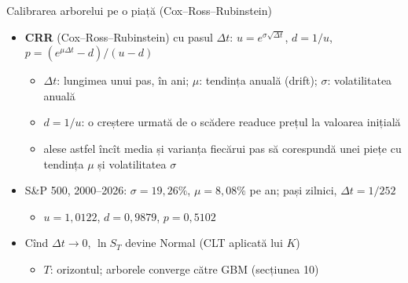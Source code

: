 \begin{frame}{Calibrarea arborelui pe o piață (Cox--Ross--Rubinstein)}
\itemsize{\footnotesize}
\begin{itemize}
    \item \textbf{CRR} (Cox--Ross--Rubinstein) cu pasul $\Delta t$: $u = e^{\sigma\sqrt{\Delta t}}$, $d = 1/u$, $p = (e^{\mu\Delta t} - d)/(u - d)$
    \begin{itemize}
        \item $\Delta t$: lungimea unui pas, în ani; $\mu$: tendința anuală (drift); $\sigma$: volatilitatea anuală
        \item $d = 1/u$: o creștere urmată de o scădere readuce prețul la valoarea inițială
        \item alese astfel încît media și varianța fiecărui pas să corespundă unei piețe cu tendința $\mu$ și volatilitatea $\sigma$
    \end{itemize}
    \item S\&P 500, 2000--2026: $\sigma = 19{,}26\%$, $\mu = 8{,}08\%$ pe an; pași zilnici, $\Delta t = 1/252$
    \begin{itemize}
        \item $u = 1{,}0122$, $d = 0{,}9879$, $p = 0{,}5102$
    \end{itemize}
    \item Cînd $\Delta t \to 0$, $\ln S_T$ devine Normal (CLT aplicată lui $K$)
    \begin{itemize}
        \item $T$: orizontul; arborele converge către GBM (secțiunea 10)
    \end{itemize}
\end{itemize}
\end{frame}

